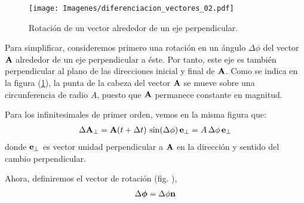 \documentclass[12pt]{article}
\begin{document}
\begin{figure}[H]
    \centering
    \texttt{[image: Imagenes/diferenciacion\_vectores\_02.pdf]}
    \caption{Rotación de un vector alrededor de un eje perpendicular.}
    \label{fig:figura_01_20}
\end{figure}
Para simplificar, consideremos primero una rotación en un ángulo $\Delta \phi$ del vector $\vb{A}$ alrededor de un eje perpendicular a éste. Por tanto, este eje es también perpendicular al plano de las direcciones inicial y final de $\vb{A}$. Como se indica en la figura (\ref{fig:figura_01_20}), la punta de la cabeza del vector $\vb{A}$ se mueve sobre una circunferencia de radio $A$, puesto que $\vb{A}$ permanece constante en magnitud. 
\par
Para los infinitesimales de primer orden, vemos en la misma figura que:
\begin{align}
    \Delta \vb{A}_{\perp} =  \vb{A} (t + \Delta t) \, \sin (\Delta \phi) \, \vb{e}_{\perp} = A \, \Delta \phi \, \vb{e}_{\perp}
    \label{eq:ecuacion_01_67}
\end{align}
donde $\vb{e}_\perp$ es vector unidad perpendicular a $\vb{A}$ en la dirección y sentido del cambio perpendicular. 
\par
Ahora, definiremos el vector de rotación (fig. ),
\begin{align}
    \Delta \bm{\phi} = \Delta \phi \vb{n}
    \label{eq:ecuacion_01_68}
\end{align}
\end{document}
